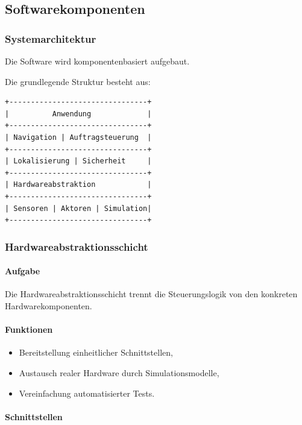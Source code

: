 \subsection{Softwarekomponenten}\label{softwarekomponenten}

\subsubsection{Systemarchitektur}\label{systemarchitektur-1}

Die Software wird komponentenbasiert aufgebaut.

Die grundlegende Struktur besteht aus:

\begin{verbatim}
+--------------------------------+
|          Anwendung             |
+--------------------------------+
| Navigation | Auftragsteuerung  |
+--------------------------------+
| Lokalisierung | Sicherheit     |
+--------------------------------+
| Hardwareabstraktion            |
+--------------------------------+
| Sensoren | Aktoren | Simulation|
+--------------------------------+
\end{verbatim}

\subsubsection{Hardwareabstraktionsschicht}\label{hardwareabstraktionsschicht}

\paragraph{Aufgabe}\label{aufgabe-6}

Die Hardwareabstraktionsschicht trennt die Steuerungslogik von den
konkreten Hardwarekomponenten.

\paragraph{Funktionen}\label{funktionen}

\begin{itemize}
\tightlist
\item
  Bereitstellung einheitlicher Schnittstellen,
\item
  Austausch realer Hardware durch Simulationsmodelle,
\item
  Vereinfachung automatisierter Tests.
\end{itemize}

\paragraph{Schnittstellen}\label{schnittstellen}

